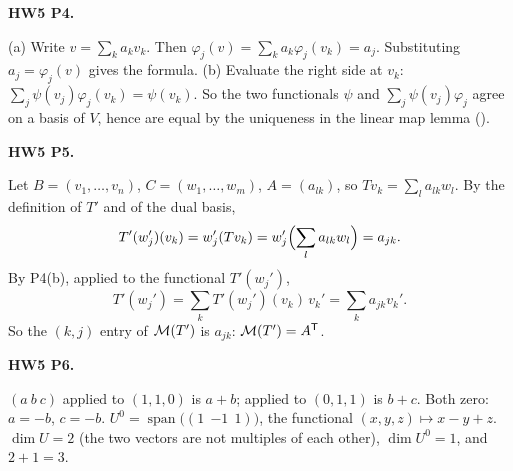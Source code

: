 \documentclass[10pt]{scrartcl}
\DeclareMathOperator{\spn}{span}\DeclareMathOperator{\nul}{null}\DeclareMathOperator{\range}{range}
\begin{document}
\begin{prob}\textbf{HW5 P4.}\par{}
\begin{steps}
  \ii (a) Write $v=\sum_ka_kv_k$. Then $\varphi_j(v)=\sum_ka_k\varphi_j(v_k)=a_j$. Substituting $a_j=\varphi_j(v)$ gives the formula.
  \ii (b) Evaluate the right side at $v_k$: $\sum_j\psi(v_j)\varphi_j(v_k)=\psi(v_k)$. So the two functionals $\psi$ and $\sum_j\psi(v_j)\varphi_j$ agree on a basis of $V$, hence are equal by the uniqueness in the linear map lemma ().
\end{steps}
\end{prob}

\begin{prob}\textbf{HW5 P5.}\par{}
\begin{steps}
  \ii Let $B=(v_1,\dots,v_n)$, $C=(w_1,\dots,w_m)$, $A=(a_{lk})$, so $Tv_k=\sum_la_{lk}w_l$.
  \ii By the definition of $T'$ and of the dual basis,
  \[
    T'(w_j')(v_k)=w_j'(Tv_k)=w_j'\Bigl(\sum_la_{lk}w_l\Bigr)=a_{jk}.
  \]
  \ii By P4(b), applied to the functional $T'(w_j')$,
  \[
    T'(w_j')=\sum_kT'(w_j')(v_k)\,v_k'=\sum_ka_{jk}v_k'.
  \]
  \ii So the $(k,j)$ entry of $\mathcal M(T')$ is $a_{jk}$: $\mathcal M(T')=A^\mathsf T$.
\end{steps}
\end{prob}

\begin{prob}\textbf{HW5 P6.}\par{}
\begin{steps}
  \ii $(a\ b\ c)$ applied to $(1,1,0)$ is $a+b$; applied to $(0,1,1)$ is $b+c$. Both zero: $a=-b$, $c=-b$.
  \ii $U^0=\spn\bigl((1\ \ {-1}\ \ 1)\bigr)$, the functional $(x,y,z)\mapsto x-y+z$.
  \ii $\dim U=2$ (the two vectors are not multiples of each other), $\dim U^0=1$, and $2+1=3$.
\end{steps}
\end{prob}
\end{document}

